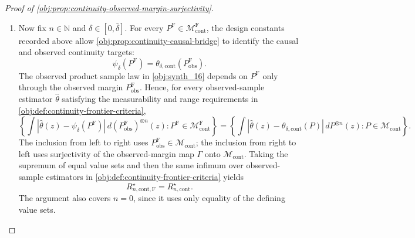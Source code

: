 \documentclass[11pt]{article}
\begin{document}
\begin{proof}[Proof of \cref{obj:prop:continuity-observed-margin-surjectivity}]
\begin{enumerate}
\[
m_x^{\mathrm F}(a)
=
P^{\mathrm F}(X=x)^{-1}
\int_{\{X=x\}}\mathsf Q_x(a,U)\,dP^{\mathrm F}
=
\int_0^1 \mathsf Q_x(a,u)\,d\lambda(u)
=
\eta_P(x,a),
\]
where \(P^{\mathrm F}(X=x)>0\) follows from \(0<p_{\min}\) and \cref{obj:ass:stratum-mass}.  Since \(a\mapsto\eta_P(x,a)\) is continuous on \([0,\bar\delta]\), \cref{obj:ass:full-data-response-continuity} holds.  Therefore
\[
P^{\mathrm F}\in\mathcal M_{\mathrm{cont}}^{\mathrm F},
\qquad
P^{\mathrm F}_{\mathrm{obs}}=P,
\]
with the observed margin understood as in \cref{obj:synth_13}.  This proves surjectivity. %

\item Now fix \(n\in\mathbb N\) and \(\delta\in[0,\bar\delta]\).  For every \(P^{\mathrm F}\in\mathcal M_{\mathrm{cont}}^{\mathrm F}\), the design constants recorded above allow \cref{obj:prop:continuity-causal-bridge} to identify the causal and observed continuity targets:
\[
\psi_\delta(P^{\mathrm F})
=
\theta_{\delta,\mathrm{cont}}(P^{\mathrm F}_{\mathrm{obs}}).
\]
The observed product sample law in \cref{obj:synth_16} depends on \(P^{\mathrm F}\) only through the observed margin \(P^{\mathrm F}_{\mathrm{obs}}\).  Hence, for every observed-sample estimator \(\widehat\theta\) satisfying the measurability and range requirements in \cref{obj:def:continuity-frontier-criteria},
\[
\left\{
\int \left|\widehat\theta(z)-\psi_\delta(P^{\mathrm F})\right|\,
d(P^{\mathrm F}_{\mathrm{obs}})^{\otimes n}(z):
P^{\mathrm F}\in\mathcal M_{\mathrm{cont}}^{\mathrm F}
\right\}
=
\left\{
\int \left|\widehat\theta(z)-\theta_{\delta,\mathrm{cont}}(P)\right|\,
dP^{\otimes n}(z):
P\in\mathcal M_{\mathrm{cont}}
\right\}.
\]
The inclusion from left to right uses \(P^{\mathrm F}_{\mathrm{obs}}\in\mathcal M_{\mathrm{cont}}\); the inclusion from right to left uses surjectivity of the observed-margin map \(\Gamma\) onto \(\mathcal M_{\mathrm{cont}}\).  Taking the supremum of equal value sets and then the same infimum over observed-sample estimators in \cref{obj:def:continuity-frontier-criteria} yields
\[
R_{n,\mathrm{cont},\mathrm F}^\star
=
R_{n,\mathrm{cont}}^\star .
\]
The argument also covers \(n=0\), since it uses only equality of the defining value sets. %


\end{enumerate}
\end{proof}
\end{document}

